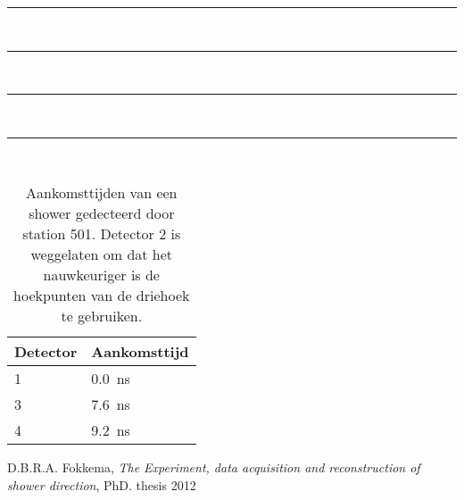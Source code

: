 \begin{center}
    \rule{\textwidth}{0.3mm}
    \\
    \rule{\textwidth}{0.3mm}
    \\
    \rule{\textwidth}{0.3mm}
    \\
    \rule{\textwidth}{0.3mm}
    \\
\end{center}

\begin{table}
    \centering
    \begin{tabular}{ |l |l |}    
        \hline
        Detector & Aankomsttijd \\ 
        \hline
        1 & \SI{0.0}{\nano\second} \\
        \hline
        3 & \SI{7.6}{\nano\second} \\
        \hline
        4 & \SI{9.2}{\nano\second} \\ 
        \hline
    \end{tabular}
    \caption{Aankomsttijden van een shower gedecteerd door station 501.
             Detector 2 is weggelaten om dat het nauwkeuriger is de
             hoekpunten van de driehoek te gebruiken.}
    \label{tab:arrival}
\end{table}
 

\begin{thebibliography}{9}
        D.B.R.A. Fokkema, \emph{The \hisparc Experiment, data
        acquisition and reconstruction of shower direction}, PhD. thesis
        2012
\end{thebibliography}


